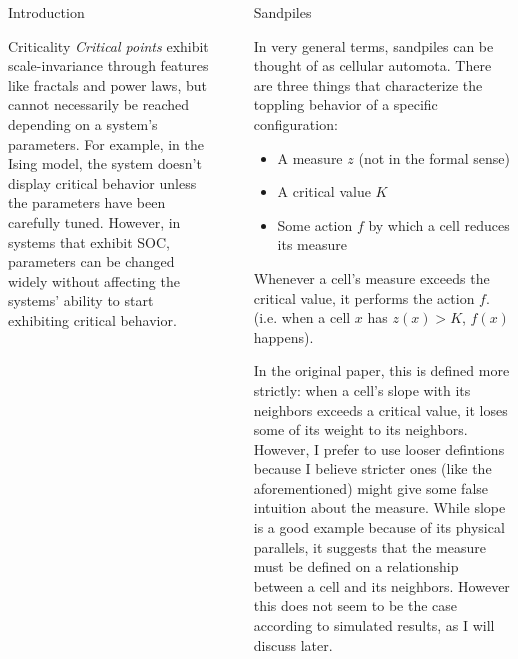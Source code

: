 \documentclass[final]{beamer}
\newlength{\sepwid}
\newlength{\onecolwid}
\begin{document}
\begin{frame}[t]
\begin{columns}[t]
\begin{column}{\onecolwid}
\begin{block}{Introduction}
\end{block}


\begin{block}{Criticality}
\textit{Critical points} exhibit scale-invariance through features like fractals and power laws, but cannot necessarily be reached depending on a system's parameters. For example, in the Ising model, the system doesn't display critical behavior unless the parameters have been carefully tuned. However, in systems that exhibit SOC, parameters can be changed widely without affecting the systems' ability to start exhibiting critical behavior.
\end{block}


\end{column} %

\begin{column}{\sepwid}\end{column} %

\begin{column}{\onecolwid} %


\begin{block}{Sandpiles}

In very general terms, sandpiles can be thought of as cellular automota. There are three things that characterize the toppling behavior of a specific configuration:
\begin{itemize}
\item A measure $z$ (not in the formal sense)
\item A critical value $K$
\item Some action $f$ by which a cell reduces its measure
\end{itemize} 
Whenever a cell's measure exceeds the critical value, it performs the action $f$. (i.e. when a cell $x$ has $z(x)>K$, $f(x)$ happens).

In the original paper, this is defined more strictly: when a cell's slope with its neighbors exceeds a critical value, it loses some of its weight to its neighbors. However, I prefer to use looser defintions because I believe stricter ones (like the aforementioned) might give some false intuition about the measure. While slope is a good example because of its physical parallels, it suggests that the measure must be defined on a relationship between a cell and its neighbors. However this does not seem to be the case according to simulated results, as I will discuss later.


\end{block}
\end{column}
\end{columns}
\end{frame}
\end{document}
